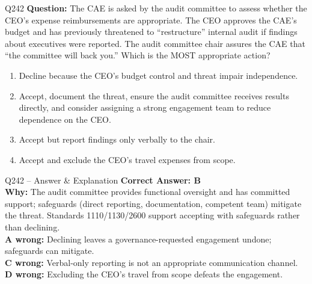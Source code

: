 \documentclass[aspectratio=169,10pt]{beamer}
\begin{document}
	\begin{frame}[t]{Q242}
		\small
		\textbf{Question:} The CAE is asked by the audit committee to assess whether the CEO's expense reimbursements are appropriate. The CEO approves the CAE's budget and has previously threatened to ``restructure'' internal audit if findings about executives were reported. The audit committee chair assures the CAE that ``the committee will back you.'' Which is the MOST appropriate action?
		\begin{enumerate}[label=\Alph*.,itemsep=1pt,topsep=2pt]
			\item Decline because the CEO's budget control and threat impair independence.
			\item Accept, document the threat, ensure the audit committee receives results directly, and consider assigning a strong engagement team to reduce dependence on the CEO.
			\item Accept but report findings only verbally to the chair.
			\item Accept and exclude the CEO's travel expenses from scope.
		\end{enumerate}
	\end{frame}
	
	\begin{frame}[t]{Q242 -- Answer \& Explanation}
		\small
		\textbf{Correct Answer: B} \\[4pt]
		\textbf{Why:} The audit committee provides functional oversight and has committed support; safeguards (direct reporting, documentation, competent team) mitigate the threat. Standards 1110/1130/2600 support accepting with safeguards rather than declining. \\[4pt]
		\textbf{A wrong:} Declining leaves a governance-requested engagement undone; safeguards can mitigate. \\[2pt]
		\textbf{C wrong:} Verbal-only reporting is not an appropriate communication channel. \\[2pt]
		\textbf{D wrong:} Excluding the CEO's travel from scope defeats the engagement.
	\end{frame}
	
\end{document}
